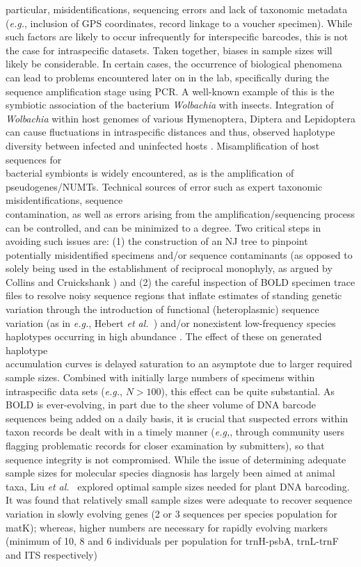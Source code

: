 particular, misidentifications, sequencing errors and lack of taxonomic metadata (\textit{e.g.}, inclusion of GPS coordinates, record linkage to a voucher specimen). While such factors are likely to occur infrequently for interspecific barcodes, this is not the case for intraspecific datasets. Taken together, biases in sample sizes  will likely be considerable. In certain cases, the occurrence of biological phenomena can lead to problems encountered later on in the lab, specifically during the sequence amplification stage using PCR. A well-known example of this is the symbiotic association of the bacterium \textit{Wolbachia} with insects. Integration of \textit{Wolbachia} within host genomes of various Hymenoptera, Diptera and Lepidoptera can cause fluctuations in intraspecific distances \cite{smith2012wolbachia} and thus, observed haplotype diversity between infected and uninfected hosts \cite{chen2017effects}. Misamplification of host sequences for \\ bacterial symbionts is widely encountered, as is the amplification of  pseudogenes/NUMTs. Technical sources of error such as expert taxonomic misidentifications, sequence \\ contamination, as well as errors arising from the  amplification/sequencing process can be controlled, and can be minimized to a degree. Two critical steps in avoiding such issues are: (1) the construction of an NJ tree to pinpoint potentially misidentified specimens and/or sequence contaminants (as opposed to solely being used in the establishment of reciprocal monophyly, as argued by Collins and Cruickshank \cite{collins2013seven}) and (2) the careful inspection of BOLD specimen trace files to resolve noisy sequence regions that inflate estimates of standing genetic variation through the introduction of functional (heteroplasmic) sequence variation (as in \textit{e.g.}, Hebert \textit{et al.}~\cite{hebert2004ten}) and/or nonexistent low-frequency species haplotypes occurring in high abundance \cite{stoeckle2012frequency}. The effect of these on generated haplotype \\ accumulation curves is delayed saturation to an asymptote due to larger required sample sizes. Combined with initially large numbers of specimens within intraspecific data sets (\textit{e.g.}, $N > 100$), this effect can be quite substantial. As BOLD is ever-evolving, in part due to the sheer volume of DNA barcode sequences being added on a daily basis, it is crucial that suspected errors within taxon records be dealt with in a timely manner (\textit{e.g,}, through community users flagging problematic records for closer examination by submitters), so that sequence integrity is not compromised. While the issue of determining adequate sample sizes for molecular species diagnosis has largely been aimed at animal taxa, Liu \textit{et al.}~\cite{liu2012sampling} explored optimal sample sizes needed for plant DNA barcoding. It was found that relatively small sample sizes were adequate to recover sequence variation in slowly evolving genes (2 or 3 sequences per species population for matK); whereas, higher numbers are necessary for rapidly evolving markers (minimum of 10, 8 and 6 individuals per population for trnH-psbA, trnL-trnF and ITS respectively) 